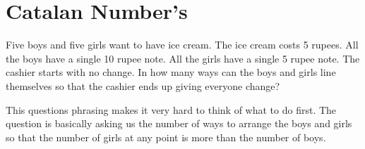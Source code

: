 \section{Catalan Number's}
\begin{example}
    Five boys and five girls want to have ice cream. The ice cream costs 5 rupees. All the boys have a single 10 rupee note. All the girls have a single 5 rupee note. The cashier starts with no change. In how many ways can the boys and girls line themselves so that the cashier ends up giving everyone change?
\end{example}
This questions phrasing makes it very hard to think of what to do first. The question is basically asking us the number of ways to arrange the boys and girls so that the number of girls at any point is more than the number of boys.  
